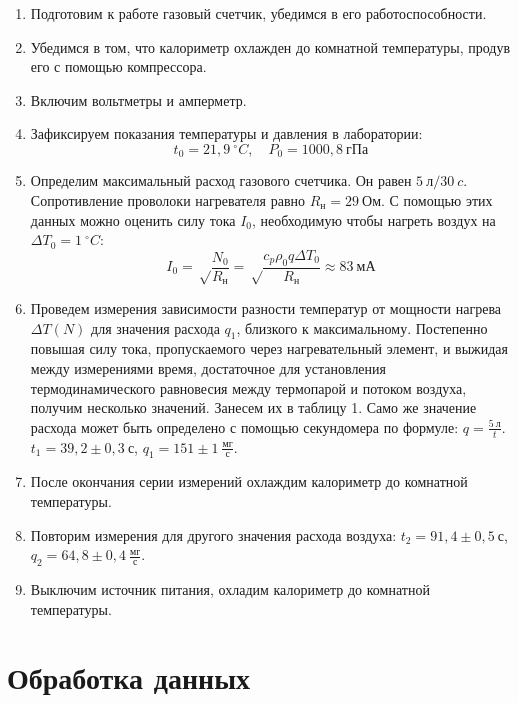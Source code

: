\documentclass[14pt, a4paper]{report}
\begin{document}
\begin{enumerate}

\item Подготовим к работе газовый счетчик, убедимся в его работоспособности.

\item Убедимся в том, что калориметр охлажден до комнатной температуры, продув его с помощью компрессора.

\item Включим вольтметры и амперметр.

\item Зафиксируем показания температуры и давления в лаборатории: 
\[t_0=21,9\ ^\circ C,\quad P_0=1000,8\ гПа\]

\item Определим максимальный расход газового счетчика. Он равен $5\ л/30\ c$. Сопротивление проволоки нагревателя равно $R_{н}=29\ Ом$. С помощью этих данных можно оценить силу тока $I_0$, необходимую чтобы нагреть воздух на $\Delta T_0=1\ ^\circ C$:
\[I_0=\sqrt\frac{N_0}{R_н}=\sqrt\frac{c_p\rho_0q\Delta T_0}{R_н}\approx83\ мА\]

\item Проведем измерения зависимости разности температур от мощности нагрева $\Delta T(N)$ для значения расхода $q_1$, близкого к максимальному. Постепенно повышая силу тока, пропускаемого через нагревательный элемент, и выжидая между измерениями время, достаточное для установления термодинамического равновесия между термопарой и потоком воздуха, получим несколько значений. Занесем их в таблицу 1. Само же значение расхода может быть определено с помощью секундомера по формуле: $q=\frac{5\ л}{t}$. $t_1=39,2\pm0,3\ с$, $q_1=151\pm1\ \frac{мг}{с}$.

\item После окончания серии измерений охлаждим калориметр до комнатной температуры.

\item Повторим измерения для другого значения расхода воздуха: $t_2=91,4\pm0,5\ с$, $q_2=64,8\pm0,4\ \frac{мг}{с}$.

\item Выключим источник питания, охладим калориметр до комнатной температуры.

\end{enumerate}

\section{Обработка данных}
\end{document}
